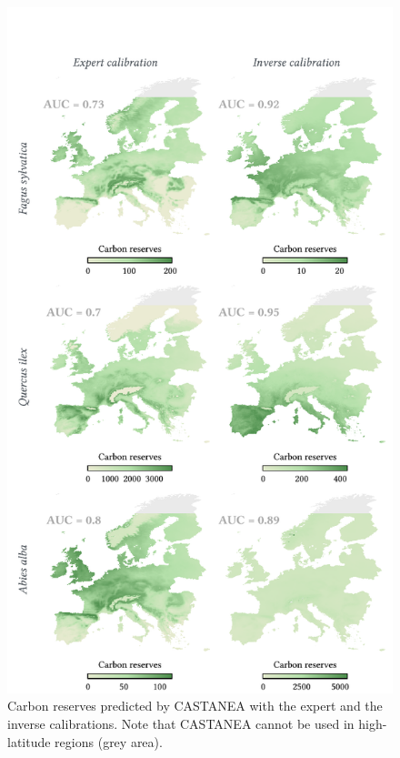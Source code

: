 \newpage

\begin{figure}[H]
\centering 
\includegraphics{chapter1/figs/supp/best_forward_maps} 
\caption{Carbon reserves predicted by CASTANEA with the expert and the inverse calibrations. Note that CASTANEA cannot be used in high-latitude regions (grey area).}\label{fig:best_forward_maps}
\end{figure}


\vspace*{3cm}

